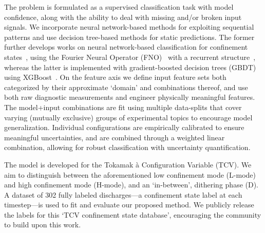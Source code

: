 The problem is formulated as a supervised classification task with model confidence, along with the ability to deal with missing and/or broken input signals. We incorporate neural network-based methods for exploiting sequential patterns and use decision tree-based methods for static predictions. The former further develops works on neural network-based classification for confinement states~\cite{mathews2019,zorek2022,orozco2022,gill2024,yang2024,he2024,shin2020,meakins2010,matoslhd2020,matoslhd2021}, using the Fourier Neural Operator (FNO)~\cite{li2021} with a recurrent structure~\cite{hochreiter1997}, whereas the latter is implemented with gradient-boosted decision trees (GBDT) using XGBoost~\cite{xgboost2016}. On the feature axis we define input feature sets both categorized by their approximate `domain' and combinations thereof, and use both raw diagnostic measurements and engineer physically meaningful features. The model+input combinations are fit using multiple data-splits that cover varying (mutually exclusive) groups of experimental topics to encourage model generalization. Individual configurations are empirically calibrated to ensure meaningful uncertainties, and are combined through a weighted linear combination, allowing for robust classification with uncertainty quantification.

The model is developed for the Tokamak à Configuration Variable (TCV). We aim to distinguish between the aforementioned low confinement mode (L-mode) and high confinement mode (H-mode), and an `in-between', dithering phase (D). A dataset of 302 fully labeled discharges---a confinement state label at each timestep---is used to fit and evaluate our proposed method. We publicly release the labels for this `TCV confinement state database', encouraging the community to build upon this work.

